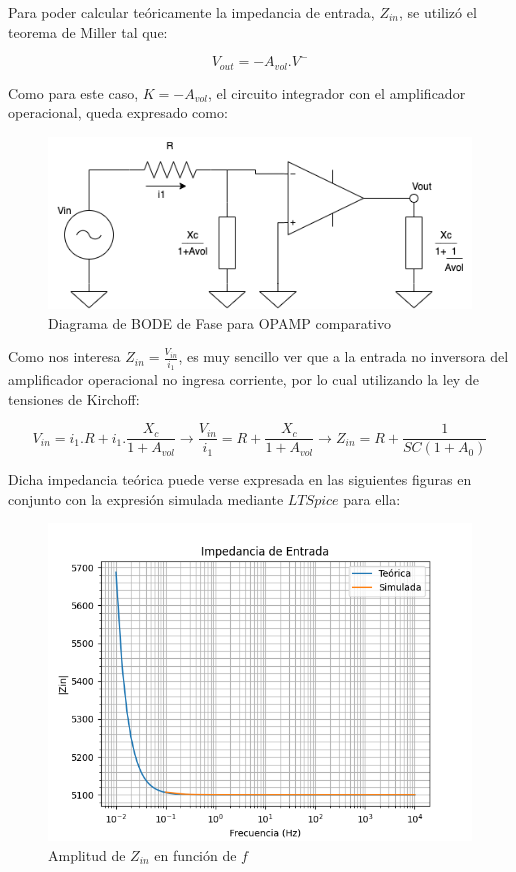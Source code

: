 Para poder calcular teóricamente la impedancia de entrada, $Z_{in}$, se utilizó el teorema de Miller tal que:

$$ V_{out}=-A_{vol}.V^-$$

Como para este caso, $K=-A_{vol}$, el circuito integrador con el amplificador operacional, queda expresado como:

\begin{figure}[H]
    \centering 
    \includegraphics [scale=0.7] {../Ejercicio3-CircuitoIntegradoresyDerivadores/Imagenes/miller-integrador.png} 
    \caption{Diagrama de BODE de Fase para OPAMP comparativo }
    \label{fig:emptyPlotTool}
\end{figure}

Como nos interesa $Z_{in}=\frac{V_{in}}{i_1}$, es muy sencillo ver que a la entrada no inversora del amplificador operacional no ingresa corriente,
por lo cual utilizando la ley de tensiones de Kirchoff:

$$ V_{in} = i_1.R + i_1.\frac{X_c}{1+A_{vol}} \longrightarrow \frac{V_{in}}{i_1}= R + \frac{X_c}{1+A_{vol}} \longrightarrow Z_{in}=R+\frac{1}{SC(1+A_0)}$$

Dicha impedancia teórica puede verse expresada en las siguientes figuras en conjunto con la expresión simulada mediante $LTSpice$ para ella:

\begin{figure}[H]
    \centering 
    \includegraphics [scale=1] {../Ejercicio3-CircuitoIntegradoresyDerivadores/Imagenes/comparativo-integrador-zin-amplitud.png} 
    \caption{Amplitud de $Z_{in}$ en función de $f$}
    \label{fig:emptyPlotTool}
\end{figure}

